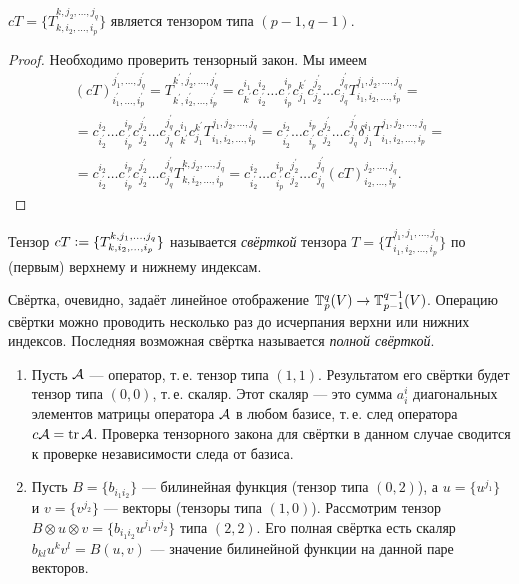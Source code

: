 \begin{proposal}
    $cT = \{T_{k, i_2, \ldots, i_p}^{k, j_2, \ldots, j_q}\}$ является тензором типа $(p - 1, q - 1)$.
\end{proposal}

\begin{proof}
    Необходимо проверить тензорный закон. Мы имеем
    \begin{multline*}
        (cT)_{i_1^\prime, \ldots, i_p^\prime}^{j_1^\prime, \ldots, j_q^\prime} = T_{k^\prime, i_2^\prime, \ldots, i_p^\prime}^{k^\prime, j_2^\prime, \ldots, j_q^\prime} = c^{i_1}_{k^\prime}c^{i_2}_{i_2^\prime}\ldots c^{i_p}_{i^\prime_p}c^{k^\prime}_{j_1}c^{j_2^\prime}_{j_2}\ldots c^{j^\prime_q}_{j_q}T_{i_1, i_2, \ldots, i_p}^{j_1, j_2, \ldots, j_q} =\\ = c^{i_2}_{i_2^\prime}\ldots c^{i_p}_{i^\prime_p}c^{j_2^\prime}_{j_2}\ldots c^{j^\prime_q}_{j_q}c^{i_1}_{k^\prime}c^{k^\prime}_{j_1}T_{i_1, i_2, \ldots, i_p}^{j_1, j_2, \ldots, j_q} = c^{i_2}_{i_2^\prime}\ldots c^{i_p}_{i^\prime_p}c^{j_2^\prime}_{j_2}\ldots c^{j^\prime_q}_{j_q}\delta^{i_1}_{j_1}T_{i_1, i_2, \ldots, i_p}^{j_1, j_2, \ldots, j_q} =\\ = c^{i_2}_{i_2^\prime}\ldots c^{i_p}_{i^\prime_p}c^{j_2^\prime}_{j_2}\ldots c^{j^\prime_q}_{j_q}T_{k, i_2, \ldots, i_p}^{k, j_2, \ldots, j_q} = c^{i_2}_{i_2^\prime}\ldots c^{i_p}_{i^\prime_p}c^{j_2^\prime}_{j_2}\ldots c^{j^\prime_q}_{j_q}(cT)_{i_2, \ldots, i_p}^{j_2, \ldots, j_q}.
    \end{multline*}
\end{proof}

\begin{definition}
    Тензор $cT \vcentcolon = \{T_{k, i_2, \ldots, i_p}^{k, j_1, \ldots, j_q}\}$ называется \textit{свёрткой} тензора $T = \{T_{i_1, i_2, \ldots, i_p}^{j_1, j_1, \ldots, j_q}\}$ по (первым) верхнему и нижнему индексам.
\end{definition}

Свёртка, очевидно, задаёт линейное отображение $\mathbb{T}_p^q(V) \to \mathbb{T}_{p - 1}^{q - 1}(V)$. Операцию свёртки можно проводить несколько раз до исчерпания верхни или нижних индексов. Последняя возможная свёртка называется \textit{полной свёрткой}.

\begin{example}
    \begin{enumerate}
        \item Пусть $\mathcal{A}$ --- оператор, т.\,е. тензор типа $(1, 1)$. Результатом его свёртки будет тензор типа $(0, 0)$, т.\,е. скаляр. Этот скаляр --- это сумма $a^i_i$ диагональных элементов матрицы оператора $\mathcal{A}$ в любом базисе, т.\,е. след оператора $c\mathcal{A} = \operatorname{tr}\mathcal{A}$. Проверка тензорного закона для свёртки в данном случае сводится к проверке независимости следа от базиса.
        \item Пусть $B = \{b_{i_1i_2}\}$ --- билинейная функция (тензор типа $(0, 2)$), а $u = \{u^{j_1}\}$ и $v = \{v^{j_2}\}$ --- векторы (тензоры типа $(1, 0)$). Рассмотрим тензор $B \otimes u \otimes v = \{b_{i_1i_2}u^{j_1}v^{j_2}\}$ типа $(2, 2)$. Его полная свёртка есть скаляр $b_{kl}u^kv^l = B(u, v)$ --- значение билинейной функции на данной паре векторов.
    \end{enumerate}
\end{example}

